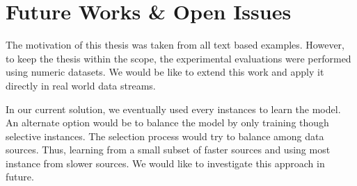 \section{Future Works \& Open Issues}
The motivation of this thesis was taken from all text based examples. However, to keep the thesis within the scope, the experimental evaluations were performed using numeric datasets. We would be like to extend this work and apply it directly in real world data streams. 

In our current solution, we eventually used every instances to learn the model. An alternate option would be to balance the model by only training though selective instances. The selection process would try to balance among data sources. Thus, learning from a small subset of faster sources and using most instance from slower sources. We would like to investigate this approach in future.





